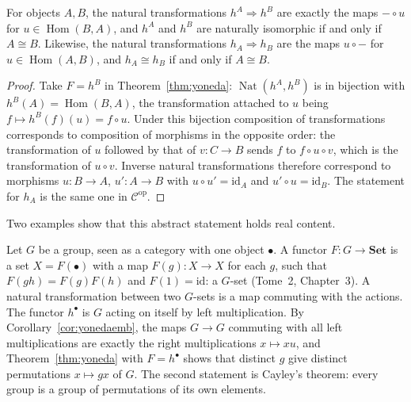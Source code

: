 \begin{corollary}\label{cor:yonedaemb}
For objects $A,B$, the natural transformations $h^A\Rightarrow h^B$ are exactly the maps $-\circ u$ for $u\in\operatorname{Hom}(B,A)$, and $h^A$ and $h^B$ are naturally isomorphic if and only if $A\cong B$. Likewise,
the natural transformations $h_A\Rightarrow h_B$ are the maps $u\circ-$ for $u\in\operatorname{Hom}(A,B)$, and $h_A\cong h_B$ if and only if $A\cong B$.
\end{corollary}

\begin{proof}
Take $F=h^B$ in Theorem~\ref{thm:yoneda}: $\operatorname{Nat}(h^A,h^B)$ is in bijection with $h^B(A)=\operatorname{Hom}(B,A)$, the transformation attached to $u$ being $f\mapsto h^B(f)(u)=f\circ u$. Under this bijection
composition of transformations corresponds to composition of morphisms in the opposite order: the transformation of $u$ followed by that of $v\colon C\to B$ sends $f$ to $f\circ u\circ v$, which is the transformation
of $u\circ v$. Inverse natural transformations therefore correspond to morphisms $u\colon B\to A$, $u'\colon A\to B$ with $u\circ u'=\mathrm{id}_A$ and $u'\circ u=\mathrm{id}_B$. The statement for $h_A$ is the same one in $\mathcal C^{\mathrm{op}}$.
\end{proof}

Two examples show that this abstract statement holds real content.

\begin{example}\label{ex:cayley}
Let $G$ be a group, seen as a category with one object $\bullet$. A functor $F\colon G\to\mathbf{Set}$ is a set $X=F(\bullet)$ with a map $F(g)\colon X\to X$ for each $g$, such that $F(gh)=F(g)F(h)$ and $F(1)=\mathrm{id}$: a $G$-set
(Tome~2, Chapter~3). A natural transformation between two $G$-sets is a map commuting with the actions. The functor $h^\bullet$ is $G$ acting on itself by left multiplication. By Corollary~\ref{cor:yonedaemb}, the maps
$G\to G$ commuting with all left multiplications are exactly the right multiplications $x\mapsto xu$, and Theorem~\ref{thm:yoneda} with $F=h^\bullet$ shows that distinct $g$ give distinct permutations
$x\mapsto gx$ of $G$. The second statement is Cayley's theorem: every group is a group of permutations of its own elements.
\end{example}

